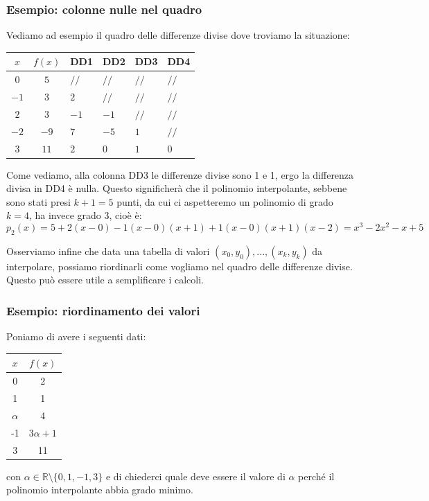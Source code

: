 \documentclass[a4paper,11pt]{article}
\begin{document}
\subsubsection{Esempio: colonne nulle nel quadro}
Vediamo ad esempio il quadro delle differenze divise dove troviamo la situazione:
\begin{table}[H]
	\center 
	\begin{tabular} { c | c | p{1cm}  p{1cm} p{1cm} p{1cm} }
		$x$ & $f(x)$ & DD1 & DD2 & DD3 & DD4\\
		\hline
		$0 $ & $ 5 $ & $ // $ & $ // $ & $ // $ & $ // $ \\
		$-1 $ & $ 3 $ & $ 2 $ & $ // $ & $ // $ & $ // $ \\
		$2 $ & $ 3 $ & $ -1 $ & $ -1 $ & $ // $ & $ // $ \\
		$-2 $ & $ -9 $ & $ 7 $ & $-5 $ & $ 1 $ & $ // $ \\
		$3 $ & $ 11 $ & $ 2 $ & $ 0 $ & $ 1 $ & $ 0 $
	\end{tabular}
\end{table}

Come vediamo, alla colonna DD3 le differenze divise sono 1 e 1, ergo la differenza divisa in DD4 è nulla.
Questo significherà che il polinomio interpolante, sebbene sono stati presi $k + 1 = 5$ punti, da cui ci aspetteremo un polinomio di grado $k = 4$, ha invece grado $3$, cioè è:
$$
p_2(x) = 5 + 2 (x - 0) - 1 (x - 0)(x + 1) + 1 (x - 0)(x + 1)(x - 2) = x^3 - 2x^2 - x + 5
$$

\par\smallskip

Osserviamo infine che data una tabella di valori $(x_0, y_0), ..., (x_k, y_k)$ da interpolare, possiamo riordinarli come vogliamo nel quadro delle differenze divise.
Questo può essere utile a semplificare i calcoli.

\subsubsection{Esempio: riordinamento dei valori}
Poniamo di avere i seguenti dati:
\begin{table}[H]
	\center 
	\begin{tabular} { c | c }
		$x$ & $f(x)$ \\
		\hline
		0 & 2 \\
		1 & 1 \\
		$\alpha$ & 4 \\
		-1 & $3 \alpha + 1$ \\
		3 & 11 
	\end{tabular}
\end{table}
con $\alpha \in \mathbb{R} \setminus \{ 0, 1, -1, 3 \}$ e di chiederci quale deve essere il valore di $\alpha$ perché il polinomio interpolante abbia grado minimo.
\end{document}
